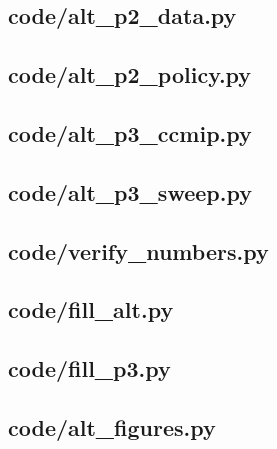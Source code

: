\documentclass{swmcmthesis}
\begin{document}
\subsection*{code/alt\_p2\_data.py}


\subsection*{code/alt\_p2\_policy.py}


\subsection*{code/alt\_p3\_ccmip.py}


\subsection*{code/alt\_p3\_sweep.py}


\subsection*{code/verify\_numbers.py}


\subsection*{code/fill\_alt.py}


\subsection*{code/fill\_p3.py}


\subsection*{code/alt\_figures.py}

\end{document}

